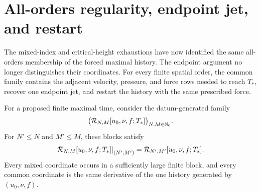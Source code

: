 \section{All-orders regularity, endpoint jet, and restart}

The mixed-index and critical-height exhaustions have now identified the same
all-orders membership of the forced maximal history.  The endpoint argument
no longer distinguishes their coordinates.  For every finite spatial order,
the common family contains the adjacent velocity, pressure, and force rows
needed to reach \(T_*\), recover one endpoint jet, and restart the history with
the same prescribed force.


\begin{definition}
\label{f:def:compatible-intersection}
For a proposed finite maximal time, consider the datum-generated family
\begin{equation}
 \bigl(\mathcal R_{N,M}[u_0,\nu,f;T_*]\bigr)_{N,M\in\mathbb N_0}.
 \label{f:eq:compatible-intersection-space}
\end{equation}
For \(N'\le N\) and \(M'\le M\), these blocks satisfy
\begin{equation}
 \left.\mathcal R_{N,M}[u_0,\nu,f;T_*]\right|_{(N',M')}
 =\mathcal R_{N',M'}[u_0,\nu,f;T_*].
 \label{f:eq:compatible-intersection}
\end{equation}
Every mixed coordinate occurs in a sufficiently large finite block, and every
common coordinate is the same derivative of the one history generated by
\((u_0,\nu,f)\).
\end{definition}

